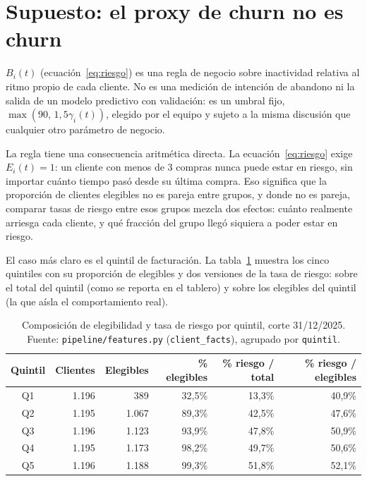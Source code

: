 \documentclass[11pt,a4paper]{article}
\begin{document}
\section{Supuesto: el proxy de churn no es churn}
\label{sec:proxy-churn}

$B_i(t)$ (ecuación~\eqref{eq:riesgo}) es una regla de negocio sobre inactividad relativa al ritmo propio de cada cliente. No es una medición de intención de abandono ni la salida de un modelo predictivo con validación: es un umbral fijo, $\max(90,\,1{,}5\gamma_i(t))$, elegido por el equipo y sujeto a la misma discusión que cualquier otro parámetro de negocio.

La regla tiene una consecuencia aritmética directa. La ecuación~\eqref{eq:riesgo} exige $E_i(t)=1$: un cliente con menos de 3 compras nunca puede estar en riesgo, sin importar cuánto tiempo pasó desde su última compra. Eso significa que la proporción de clientes elegibles no es pareja entre grupos, y donde no es pareja, comparar tasas de riesgo entre esos grupos mezcla dos efectos: cuánto realmente arriesga cada cliente, y qué fracción del grupo llegó siquiera a poder estar en riesgo.

El caso más claro es el quintil de facturación. La tabla~\ref{tab:quintiles} muestra los cinco quintiles con su proporción de elegibles y dos versiones de la tasa de riesgo: sobre el total del quintil (como se reporta en el tablero) y sobre los elegibles del quintil (la que aísla el comportamiento real).

\begin{table}[h]
\centering
\begin{tabular}{@{}crrrrr@{}}
\toprule
Quintil & Clientes & Elegibles & \% elegibles & \% riesgo / total & \% riesgo / elegibles \\
\midrule
Q1 & 1.196 & 389 & 32,5\% & 13,3\% & 40,9\% \\
Q2 & 1.195 & 1.067 & 89,3\% & 42,5\% & 47,6\% \\
Q3 & 1.196 & 1.123 & 93,9\% & 47,8\% & 50,9\% \\
Q4 & 1.195 & 1.173 & 98,2\% & 49,7\% & 50,6\% \\
Q5 & 1.196 & 1.188 & 99,3\% & 51,8\% & 52,1\% \\
\bottomrule
\end{tabular}
\caption{Composición de elegibilidad y tasa de riesgo por quintil, corte 31/12/2025. Fuente: \texttt{pipeline/features.py} (\texttt{client\_facts}), agrupado por \texttt{quintil}.}
\label{tab:quintiles}
\end{table}
\end{document}
